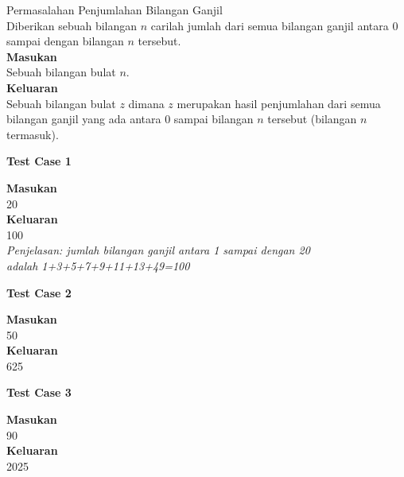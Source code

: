 \newpage
\begin{permasalahan}{Permasalahan Penjumlahan Bilangan Ganjil}\\
	Diberikan sebuah bilangan $n$ carilah jumlah dari semua bilangan ganjil antara 0 sampai dengan bilangan $n$ tersebut.\\
	\textbf{Masukan}\\
	Sebuah bilangan bulat $n$.\\
	\textbf{Keluaran}\\
	Sebuah bilangan bulat $z$ dimana $z$ merupakan hasil penjumlahan dari semua bilangan ganjil yang ada antara 0 sampai bilangan $n$ tersebut (bilangan $n$ termasuk).\\
	\begin{center}
	\textbf{Test Case 1}\\
	\end{center}
	\textbf{Masukan}\\
	20\\
	\textbf{Keluaran}\\
	100\\
	\textit{Penjelasan: jumlah bilangan ganjil antara 1 sampai dengan 20 \\adalah 1+3+5+7+9+11+13+49=100}\\
	\begin{center}
	\textbf{Test Case 2}\\
	\end{center}
	\textbf{Masukan}\\
	50\\
	\textbf{Keluaran}\\
	625\\
	\begin{center}
	\textbf{Test Case 3}\\
	\end{center}
	\textbf{Masukan}\\
	90\\
	\textbf{Keluaran}\\
	2025\\
\end{permasalahan}

